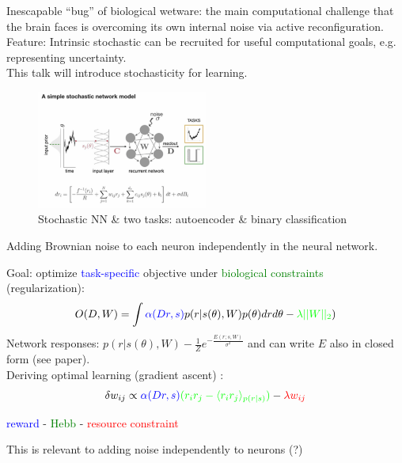 \documentclass[12pt]{article}
\begin{document}
Inescapable ``bug'' of biological wetware: the main computational challenge that the brain faces is overcoming its own internal noise via active reconfiguration. \\

Feature: Intrinsic stochastic can be recruited for useful computational goals, e.g. representing uncertainty.  \\

This talk will introduce stochasticity for learning. 
\begin{figure}
  \centering
      \includegraphics[width=0.5\textwidth]{images/stochnn.png}
  \caption{Stochastic NN \& two tasks: autoencoder \& binary classification}
\end{figure}

Adding Brownian noise to each neuron independently in the neural network.

Goal: optimize \textcolor{blue}{task-specific} objective under \textcolor{green}{biological constraints} (regularization):
$$
O(D,W) = \int \textcolor{blue}{\alpha(Dr, s)}p(r|s(\theta),W)p(\theta)drd\theta - \textcolor{green}{\lambda ||W||_2})
$$
Network responses: $p(r|s(\theta),W) - \frac{1}{Z}e^{-\frac{E(r;s,W)}{\sigma^2}}$ and can write $E$ also in closed form (see paper). \\

Deriving optimal learning (gradient ascent) \cite{Williams1992, Fiete2006, Fiete2007, Scellier16, Miconi2017}:
$$
\delta w_{ij} \propto \textcolor{blue}{\alpha(Dr,s)}\textcolor{green}{(r_ir_j - \langle r_ir_j \rangle_{p(r|s)})} - \textcolor{red}{\lambda w_{ij}}
$$
\begin{center}
\textcolor{blue}{reward} - \textcolor{green}{Hebb} - \textcolor{red}{resource constraint}
\end{center}

This is relevant to adding noise independently to neurons (?) \\
\end{document}
